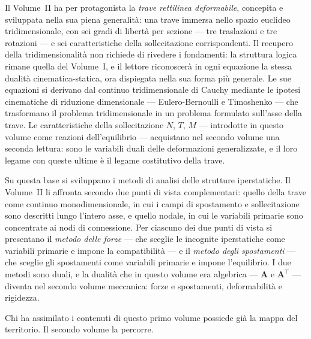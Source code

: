 Il Volume~II ha per protagonista la \textit{trave rettilinea deformabile}, concepita e sviluppata nella sua piena generalità: una trave immersa nello spazio euclideo tridimensionale, con sei gradi di libertà per sezione --- tre traslazioni e tre rotazioni --- e sei caratteristiche della sollecitazione corrispondenti. Il recupero della tridimensionalità non richiede di rivedere i fondamenti: la struttura logica rimane quella del Volume~I, e il lettore riconoscerà in ogni equazione la stessa dualità cinematica-statica, ora dispiegata nella sua forma più generale. Le sue equazioni si derivano dal continuo tridimensionale di Cauchy mediante le ipotesi cinematiche di riduzione dimensionale --- Eulero-Bernoulli e Timoshenko --- che trasformano il problema tridimensionale in un problema formulato sull'asse della trave. Le caratteristiche della sollecitazione $N$, $T$, $M$ --- introdotte in questo volume come reazioni dell'equilibrio --- acquistano nel secondo volume una seconda lettura: sono le variabili duali delle deformazioni generalizzate, e il loro legame con queste ultime è il legame costitutivo della trave.

Su questa base si sviluppano i metodi di analisi delle strutture iperstatiche. Il Volume~II li affronta secondo due punti di vista complementari: quello della trave come continuo monodimensionale, in cui i campi di spostamento e sollecitazione sono descritti lungo l'intero asse, e quello nodale, in cui le variabili primarie sono concentrate ai nodi di connessione. Per ciascuno dei due punti di vista si presentano il \textit{metodo delle forze} --- che sceglie le incognite iperstatiche come variabili primarie e impone la compatibilità --- e il \textit{metodo degli spostamenti} --- che sceglie gli spostamenti come variabili primarie e impone l'equilibrio. I due metodi sono duali, e la dualità che in questo volume era algebrica --- $\bm{A}$ e $\bm{A}^\top$ --- diventa nel secondo volume meccanica: forze e spostamenti, deformabilità e rigidezza.

Chi ha assimilato i contenuti di questo primo volume possiede già la mappa del territorio. Il secondo volume la percorre.